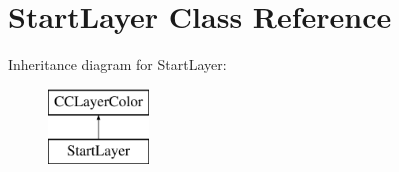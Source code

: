\hypertarget{class_start_layer}{\section{Start\-Layer Class Reference}
\label{class_start_layer}
}
Inheritance diagram for Start\-Layer\-:\begin{figure}[H]
\begin{center}
\leavevmode
\includegraphics[height=2.000000cm]{class_start_layer}
\end{center}
\end{figure}
